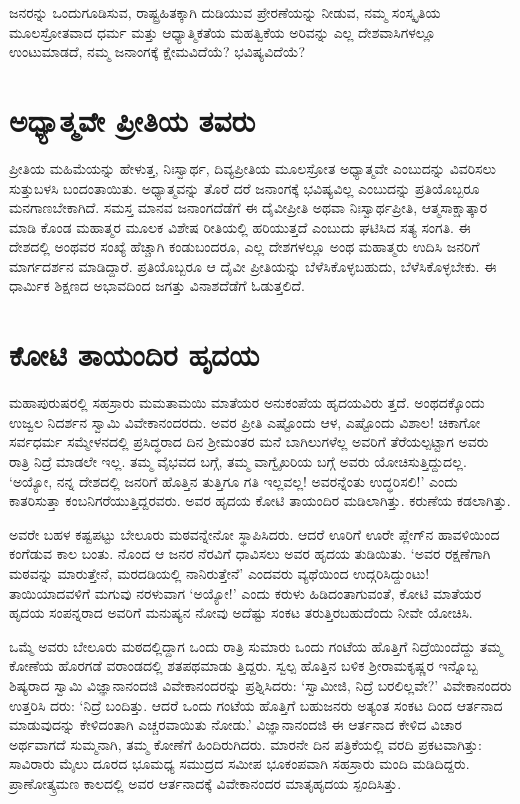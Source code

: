 ಜನರನ್ನು ಒಂದುಗೂಡಿಸುವ, ರಾಷ್ಟ್ರಹಿತಕ್ಕಾಗಿ ದುಡಿಯುವ ಪ್ರೇರಣೆಯನ್ನು ನೀಡುವ, ನಮ್ಮ ಸಂಸ್ಕೃತಿಯ ಮೂಲಸ್ರೋತವಾದ ಧರ್ಮ ಮತ್ತು ಆಧ್ಯಾತ್ಮಿಕತೆಯ ಮಹತ್ವಿಕೆಯ ಅರಿವನ್ನು ಎಲ್ಲ ದೇಶವಾಸಿಗಳಲ್ಲೂ ಉಂಟುಮಾಡದೆ, ನಮ್ಮ ಜನಾಂಗಕ್ಕೆ ಕ್ಷೇಮವಿದೆಯೆ? ಭವಿಷ್ಯವಿದೆಯೆ?


\section{ಅಧ್ಯಾತ್ಮವೇ ಪ್ರೀತಿಯ ತವರು}

ಪ್ರೀತಿಯ ಮಹಿಮೆಯನ್ನು ಹೇಳುತ್ತ, ನಿಃಸ್ವಾರ್ಥ, ದಿವ್ಯಪ್ರೀತಿಯ ಮೂಲಸ್ರೋತ ಅಧ್ಯಾತ್ಮವೇ ಎಂಬುದನ್ನು ವಿವರಿಸಲು ಸುತ್ತುಬಳಸಿ ಬಂದಂತಾಯಿತು. ಅಧ್ಯಾತ್ಮವನ್ನು ತೊರೆ ದರೆ ಜನಾಂಗಕ್ಕೆ ಭವಿಷ್ಯವಿಲ್ಲ ಎಂಬುದನ್ನು ಪ್ರತಿಯೊಬ್ಬರೂ ಮನಗಾಣಬೇಕಾಗಿದೆ. ಸಮಸ್ತ ಮಾನವ ಜನಾಂಗದೆಡೆಗೆ ಈ ದೈವೀಪ್ರೀತಿ ಅಥವಾ ನಿಃಸ್ವಾರ್ಥಪ್ರೀತಿ, ಆತ್ಮಸಾಕ್ಷಾತ್ಕಾರ ಮಾಡಿ ಕೊಂಡ ಮಹಾತ್ಮರ ಮೂಲಕ ವಿಶೇಷ ರೀತಿಯಲ್ಲಿ ಹರಿಯುತ್ತದೆ ಎಂಬುದು ಘಟಿಸಿದ ಸತ್ಯ ಸಂಗತಿ. ಈ ದೇಶದಲ್ಲಿ ಅಂಥವರ ಸಂಖ್ಯೆ ಹೆಚ್ಚಾಗಿ ಕಂಡುಬಂದರೂ, ಎಲ್ಲ ದೇಶಗಳಲ್ಲೂ ಅಂಥ ಮಹಾತ್ಮರು ಉದಿಸಿ ಜನರಿಗೆ ಮಾರ್ಗದರ್ಶನ ಮಾಡಿದ್ದಾರೆ. ಪ್ರತಿಯೊಬ್ಬರೂ ಆ ದೈವೀ ಪ್ರೀತಿಯನ್ನು ಬೆಳೆಸಿಕೊಳ್ಳಬಹುದು, ಬೆಳೆಸಿಕೊಳ್ಳಬೇಕು. ಈ ಧಾರ್ಮಿಕ ಶಿಕ್ಷಣದ ಅಭಾವದಿಂದ ಜಗತ್ತು ವಿನಾಶದೆಡೆಗೆ ಓಡುತ್ತಲಿದೆ.


\section{ಕೋಟಿ ತಾಯಂದಿರ ಹೃದಯ}

ಮಹಾಪುರುಷರಲ್ಲಿ ಸಹಸ್ರಾರು ಮಮತಾಮಯಿ ಮಾತೆಯರ ಅನುಕಂಪೆಯ ಹೃದಯವಿರು ತ್ತದೆ. ಅಂಥದಕ್ಕೊಂದು ಉಜ್ವಲ ನಿದರ್ಶನ ಸ್ವಾಮಿ ವಿವೇಕಾನಂದರದು. ಅವರ ಪ್ರೀತಿ ಎಷ್ಟೊಂದು ಆಳ, ಎಷ್ಟೊಂದು ವಿಶಾಲ! ಚಿಕಾಗೋ ಸರ್ವಧರ್ಮ ಸಮ್ಮೇಳನದಲ್ಲಿ ಪ್ರಸಿದ್ಧರಾದ ದಿನ ಶ‍್ರೀಮಂತರ ಮನೆ ಬಾಗಿಲುಗಳೆಲ್ಲ ಅವರಿಗೆ ತೆರೆಯಲ್ಪಟ್ಟಾಗ ಅವರು ರಾತ್ರಿ ನಿದ್ರೆ ಮಾಡಲೇ ಇಲ್ಲ. ತಮ್ಮ ವೈಭವದ ಬಗ್ಗೆ, ತಮ್ಮ ವಾಗ್ವೈಖರಿಯ ಬಗ್ಗೆ ಅವರು ಯೋಚಿಸುತ್ತಿದ್ದುದಲ್ಲ. ‘ಅಯ್ಯೋ, ನನ್ನ ದೇಶದಲ್ಲಿ ಜನರಿಗೆ ಹೊತ್ತಿನ ತುತ್ತಿಗೂ ಗತಿ ಇಲ್ಲವಲ್ಲ! ಅವರನ್ನೆಂತು ಉದ್ಧರಿಸಲಿ!’ ಎಂದು ಕಾತರಿಸುತ್ತಾ ಕಂಬನಿಗರೆಯುತ್ತಿದ್ದರವರು. ಅವರ ಹೃದಯ ಕೋಟಿ ತಾಯಂದಿರ ಮಡಿಲಾಗಿತ್ತು. ಕರುಣೆಯ ಕಡಲಾಗಿತ್ತು.

ಅವರೇ ಬಹಳ ಕಷ್ಟಪಟ್ಟು ಬೇಲೂರು ಮಠವನ್ನೇನೋ ಸ್ಥಾಪಿಸಿದರು. ಆದರೆ ಊರಿಗೆ ಊರೇ ಪ್ಲೇಗ್​ನ ಹಾವಳಿಯಿಂದ ಕಂಗೆಡುವ ಕಾಲ ಬಂತು. ನೊಂದ ಆ ಜನರ ನೆರವಿಗೆ ಧಾವಿಸಲು ಅವರ ಹೃದಯ ತುಡಿಯಿತು. ‘ಅವರ ರಕ್ಷಣೆಗಾಗಿ ಮಠವನ್ನು ಮಾರುತ್ತೇನೆ, ಮರದಡಿಯಲ್ಲಿ ನಾನಿರುತ್ತೇನೆ’ ಎಂದವರು ವ್ಯಥೆಯಿಂದ ಉದ್ಗರಿಸಿದ್ದುಂಟು! ತಾಯಿಯಾದವಳಿಗೆ ಮಗುವು ನರಳುವಾಗ ‘ಅಯ್ಯೋ!’ ಎಂದು ಕರುಳು ಹಿಡಿದಂತಾಗುವಂತೆ, ಕೋಟಿ ಮಾತೆಯರ ಹೃದಯ ಸಂಪನ್ನರಾದ ಅವರಿಗೆ ಮನುಷ್ಯನ ನೋವು ಅದೆಷ್ಟು ಸಂಕಟ ತರುತ್ತಿರಬಹುದೆಂದು ನೀವೇ ಯೋಚಿಸಿ.

ಒಮ್ಮೆ ಅವರು ಬೇಲೂರು ಮಠದಲ್ಲಿದ್ದಾಗ ಒಂದು ರಾತ್ರಿ ಸುಮಾರು ಒಂದು ಗಂಟೆಯ ಹೊತ್ತಿಗೆ ನಿದ್ರೆಯಿಂದೆದ್ದು ತಮ್ಮ ಕೋಣೆಯ ಹೊರಗಡೆ ವರಾಂಡದಲ್ಲಿ ಶತಪಥಮಾಡು ತ್ತಿದ್ದರು. ಸ್ವಲ್ಪ ಹೊತ್ತಿನ ಬಳಿಕ ಶ‍್ರೀರಾಮಕೃಷ್ಣರ ಇನ್ನೊಬ್ಬ ಶಿಷ್ಯರಾದ ಸ್ವಾಮಿ ವಿಜ್ಞಾನಾನಂದಜಿ ವಿವೇಕಾನಂದರನ್ನು ಪ್ರಶ್ನಿಸಿದರು: ‘ಸ್ವಾಮೀಜಿ, ನಿದ್ರೆ ಬರಲಿಲ್ಲವೇ?’ ವಿವೇಕಾನಂದರು ಉತ್ತರಿಸಿ ದರು: ‘ನಿದ್ರೆ ಬಂದಿತ್ತು. ಆದರೆ ಒಂದು ಗಂಟೆಯ ಹೊತ್ತಿಗೆ ಬಹುಜನರು ಅತ್ಯಂತ ಸಂಕಟ ದಿಂದ ಆರ್ತನಾದ ಮಾಡುವುದನ್ನು ಕೇಳಿದಂತಾಗಿ ಎಚ್ಚರವಾಯಿತು ನೋಡು.’ ವಿಜ್ಞಾನಾನಂದಜಿ ಈ ಆರ್ತನಾದ ಕೇಳಿದ ವಿಚಾರ ಅರ್ಥವಾಗದೆ ಸುಮ್ಮನಾಗಿ, ತಮ್ಮ ಕೋಣೆಗೆ ಹಿಂದಿರುಗಿದರು. ಮಾರನೇ ದಿನ ಪತ್ರಿಕೆಯಲ್ಲಿ ವರದಿ ಪ್ರಕಟವಾಗಿತ್ತು: ಸಾವಿರಾರು ಮೈಲು ದೂರದ ಭೂಮಧ್ಯ ಸಮುದ್ರದ ಸಮೀಪ ಭೂಕಂಪವಾಗಿ ಸಹಸ್ರಾರು ಮಂದಿ ಮಡಿದಿದ್ದರು. ಪ್ರಾಣೋತ್ಕ್ರಮಣ ಕಾಲದಲ್ಲಿ ಅವರ ಆರ್ತನಾದಕ್ಕೆ ವಿವೇಕಾನಂದರ ಮಾತೃಹೃದಯ ಸ್ಪಂದಿಸಿತ್ತು.

